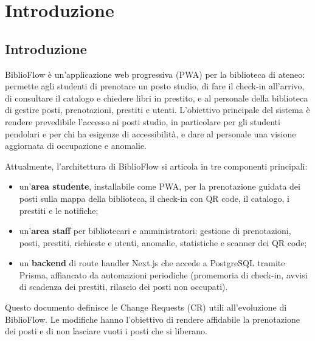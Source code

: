 \documentclass[11pt,a4paper,oneside,openany]{book}
\begin{document}
\frontmatter
\copertina
\tableofcontents
\listoftables

\mainmatter
\chapter{Introduzione}

\section{Introduzione}

BiblioFlow è un'applicazione web progressiva (PWA) per la biblioteca di ateneo:
permette agli studenti di prenotare un posto studio, di fare il check-in
all'arrivo, di consultare il catalogo e chiedere libri in prestito, e al
personale della biblioteca di gestire posti, prenotazioni, prestiti e utenti.
L'obiettivo principale del sistema è rendere prevedibile l'accesso ai posti
studio, in particolare per gli studenti pendolari e per chi ha esigenze di
accessibilità, e dare al personale una visione aggiornata di occupazione e
anomalie.

Attualmente, l'architettura di BiblioFlow si articola in tre componenti
principali:
\begin{itemize}
  \item un'\textbf{area studente}, installabile come PWA, per la prenotazione
        guidata dei posti sulla mappa della biblioteca, il check-in con QR code,
        il catalogo, i prestiti e le notifiche;
  \item un'\textbf{area staff} per bibliotecari e amministratori: gestione di
        prenotazioni, posti, prestiti, richieste e utenti, anomalie, statistiche
        e scanner dei QR code;
  \item un \textbf{backend} di route handler Next.js che accede a PostgreSQL
        tramite Prisma, affiancato da automazioni periodiche (promemoria di
        check-in, avvisi di scadenza dei prestiti, rilascio dei posti non
        occupati).
\end{itemize}

Questo documento definisce le Change Requests (CR) utili all'evoluzione di
BiblioFlow. Le modifiche hanno l'obiettivo di rendere affidabile la
prenotazione dei posti e di non lasciare vuoti i posti che si liberano.
\end{document}
